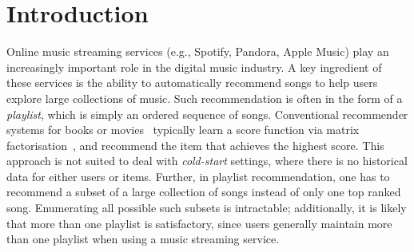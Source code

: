 
\section{Introduction}
\label{sec:intro}
Online music streaming services (e.g., Spotify, Pandora, Apple Music) %
play an increasingly important role in the digital music industry.
A key ingredient of these services is the ability to automatically recommend songs to help users explore large collections of music.
Such recommendation is often in the form of a \emph{playlist}, which is simply an ordered sequence of songs.
%
Conventional recommender systems for books or movies~\citep{Sarwar:2001,Netflix}
typically learn a score function via matrix factorisation~\citep{Koren:2009},
and recommend the item that achieves the highest score.
This approach is not suited to deal with \emph{cold-start} settings,
where there is no historical data for either users or items.
%
Further, in playlist recommendation,
one has to recommend a subset of a large collection of songs instead of only one top ranked song.
Enumerating all possible such subsets is intractable;
additionally,
it is likely that more than one playlist is satisfactory, since
users generally maintain more than one playlist when using a music streaming service.



